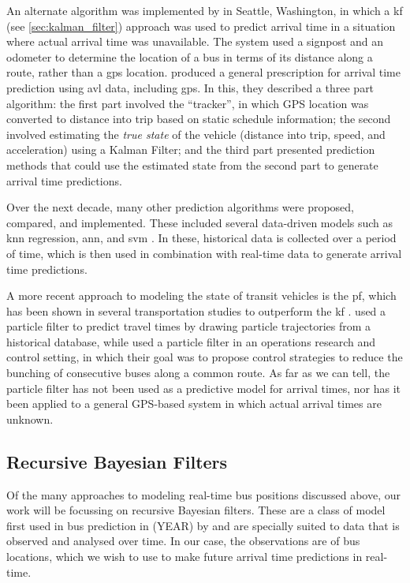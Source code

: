 \documentclass[12pt,a4paper]{article}
\begin{document}
An alternate algorithm was implemented by \cite{dailey:2001} in Seattle, Washington,
in which a \gls{kf} (see \cref{sec:kalman_filter}) 
approach was used to predict arrival time in a situation where
actual arrival time was unavailable.
The system used a signpost and an odometer to determine the location of a bus 
in terms of its distance along a route, rather than a \gls{gps} location.
\cite{cathey-dailey:2003} produced a general prescription for arrival time prediction using
\gls{avl} data, including \gls{gps}.
In this, they described a three part algorithm:
the first part involved the ``tracker'', in which GPS location was converted to distance into trip
based on static schedule information;
the second involved estimating the \emph{true state} of the vehicle (distance into trip, speed, 
and acceleration) using a Kalman Filter;
and the third part presented prediction methods
that could use the estimated state from the second part to generate arrival time predictions.


Over the next decade, many other prediction algorithms were proposed, compared, and implemented.
These included several data-driven models such as \gls{knn} regression,
\gls{ann}, and \gls{svm} 
\citep{chang-etal:2010,jeong-rilett:2005,yu-etal:2006,yu-etal:2010,yu-etal:2011}.
In these, historical data is collected over a period of time,
which is then used in combination with
real-time data to generate arrival time predictions.


A more recent approach to modeling the state of transit vehicles is the \gls{pf},
which has been shown in several transportation studies to outperform the \gls{kf}
\citep{chen-rakha:2014,cn}.
\cite{chen-rakha:2014} used a particle filter to predict travel times 
by drawing particle trajectories from a historical database,
while \cite{hans-etal:2015} used a particle filter in an operations research and control setting,
in which their goal was to propose control strategies to reduce the bunching of consecutive buses
along a common route.
As far as we can tell, the particle filter has not been used as a predictive model for
arrival times, nor has it been applied to a general GPS-based system in which actual arrival times
are unknown.




\subsection{Recursive Bayesian Filters}
\label{sec:recursive}


Of the many approaches to modeling real-time bus positions discussed above,
our work will be focussing on recursive Bayesian filters.
These are a class of model first used in bus prediction in (YEAR) by \cite{cn}
and are specially suited to data that is observed and analysed over time.
In our case, the observations are of bus locations,
which we wish to use to make future arrival time predictions in real-time.
\end{document}
